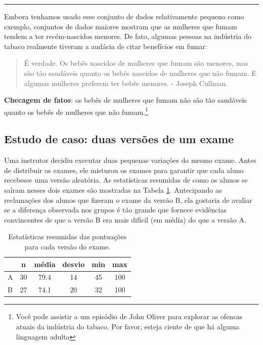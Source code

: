 \documentclass[
]{book}
\theoremstyle{definition}
\theoremstyle{definition}
\theoremstyle{definition}
\theoremstyle{definition}
\theoremstyle{remark}
\begin{document}
\begin{center}\rule{0.5\linewidth}{0.5pt}\end{center}

Embora tenhamos usado esse conjunto de dados relativamente pequeno como exemplo, conjuntos de dados maiores mostram que as mulheres que fumam tendem a ter recém-nascidos menores. De fato, algumas pessoas na indústria do tabaco realmente tiveram a audácia de citar benefícios em fumar:

\begin{quote}
É verdade. Os bebês nascidos de mulheres que fumam são menores, mas são tão saudáveis quanto os bebês nascidos de mulheres que não fumam. E algumas mulheres preferem ter bebês menores. - Joseph Cullman.
\end{quote}

\textbf{Checagem de fatos}: os bebês de mulheres que fumam não são tão saudáveis quanto os bebês de mulheres que não fumam.\footnote{Você pode assistir a um episódio de John Oliver para explorar as ofensas atuais da indústria do tabaco. Por favor, esteja ciente de que há alguma linguagem adulta}

\hypertarget{caseStudyTwoVersions}{%
\subsection{Estudo de caso: duas versões de um exame}\label{caseStudyTwoVersions}}

Uma instrutor decidiu executar duas pequenas variações do mesmo exame. Antes de distribuir os exames, ele misturou os exames para garantir que cada aluno recebesse uma versão aleatória. As estatísticas resumidas de como os alunos se saíram nesses dois exames são mostradas na Tabela \ref{tab:summaryStatsForTwoVersionsOfExams}. Antecipando as reclamações dos alunos que fizeram o exame da versão B, ela gostaria de avaliar se a diferença observada nos grupos é tão grande que fornece evidências convincentes de que a versão B era mais difícil (em média) do que a versão A.

\begin{table}

\caption{\label{tab:summaryStatsForTwoVersionsOfExams}Estatísticas resumidas das pontuações para cada versão do exame.}
\centering
\begin{tabular}[t]{l|c|c|c|c|c}
\hline
  & n & média & desvio & min & max\\
\hline
A & 30 & 79.4 & 14 & 45 & 100\\
\hline
B & 27 & 74.1 & 20 & 32 & 100\\
\hline
\end{tabular}
\end{table}
\end{document}
